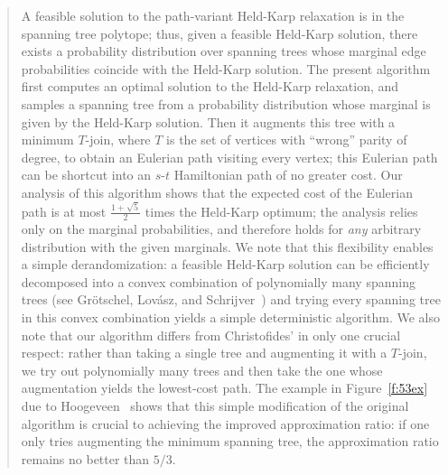 \documentclass[11pt,letterpaper]{article}
\newcommand{\st}{\mbox{$s$-$t$} }
\begin{document}
\begin{quote}
A feasible solution to the path-variant Held-Karp relaxation is in the spanning tree polytope; thus, given a feasible Held-Karp solution, there exists a probability distribution over spanning trees whose marginal edge probabilities coincide with the Held-Karp solution. The present algorithm first computes an optimal solution to the Held-Karp relaxation, and samples a spanning tree from a probability distribution whose marginal is given by the Held-Karp solution. Then it augments this tree with a minimum $T$-join, where $T$ is the set of vertices with ``wrong'' parity of degree, to obtain an Eulerian path visiting every vertex; this Eulerian path can be shortcut into an \st Hamiltonian path of no greater cost. Our analysis of this algorithm shows that the expected cost of the Eulerian path is at most $\frac{1+\sqrt{5}}{2}$ times the Held-Karp optimum; the analysis relies only on the marginal probabilities, and therefore holds for \emph{any} arbitrary distribution with the given marginals. We note that this flexibility enables a simple derandomization: a feasible Held-Karp solution can be efficiently decomposed into a convex combination of polynomially many spanning trees (see Gr{\"o}tschel, Lov{\'a}sz, and Schrijver~\cite{GLS}) and trying every spanning tree in this convex combination yields a simple deterministic algorithm. We also note that our algorithm differs from Christofides' in only one crucial respect: rather than taking a single tree and augmenting it with a $T$-join, we try out polynomially many trees and then take the one whose augmentation yields the lowest-cost path. The example in Figure~\ref{f:53ex} due to Hoogeveen~\cite{H} shows that this simple modification of the original algorithm is crucial to achieving the improved approximation ratio: if one only tries augmenting the minimum spanning tree, the approximation ratio remains no better than $5/3$.


\end{quote}
\end{document}
